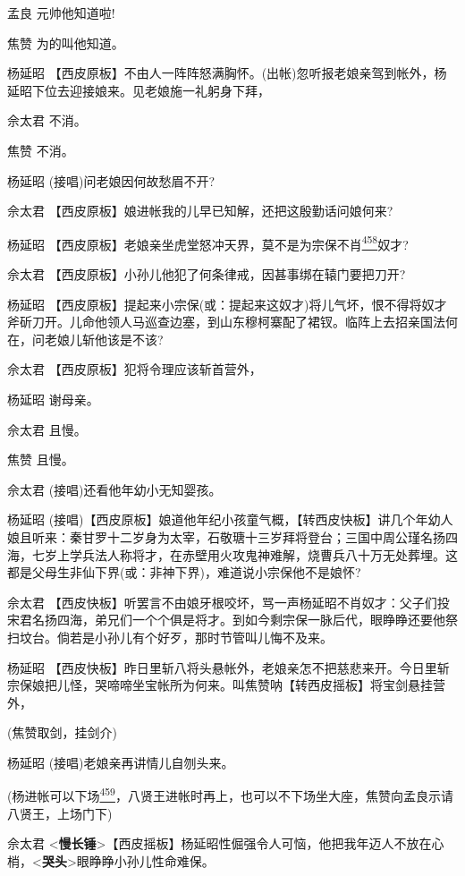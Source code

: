 孟良 元帅他知道啦!

焦赞 为的叫他知道。

杨延昭
【西皮原板】不由人一阵阵怒满胸怀。(出帐)忽听报老娘亲驾到帐外，杨延昭下位去迎接娘来。见老娘施一礼躬身下拜，

佘太君 不消。

焦赞 不消。

杨延昭 (接唱)问老娘因何故愁眉不开?

佘太君 【西皮原板】娘进帐我的儿早已知解，还把这殷勤话问娘何来?

杨延昭
【西皮原板】老娘亲坐虎堂怒冲天界，莫不是为宗保不肖\protect\hyperlink{fn458}{\textsuperscript{458}}奴才?

佘太君 【西皮原板】小孙儿他犯了何条律戒，因甚事绑在辕门要把刀开?

杨延昭
【西皮原板】提起来小宗保(或：提起来这奴才)将儿气坏，恨不得将奴才斧斫刀开。儿命他领人马巡查边塞，到山东穆柯寨配了裙钗。临阵上去招亲国法何在，问老娘儿斩他该是不该?

佘太君 【西皮原板】犯将令理应该斩首营外，

杨延昭 谢母亲。

佘太君 且慢。

焦赞 且慢。

佘太君 (接唱)还看他年幼小无知婴孩。

杨延昭
(接唱)【西皮原板】娘道他年纪小孩童气概，【转西皮快板】讲几个年幼人娘且听来：秦甘罗十二岁身为太宰，石敬瑭十三岁拜将登台；三国中周公瑾名扬四海，七岁上学兵法人称将才，在赤壁用火攻鬼神难解，烧曹兵八十万无处葬埋。这都是父母生非仙下界(或：非神下界)，难道说小宗保他不是娘怀?

佘太君
【西皮快板】听罢言不由娘牙根咬坏，骂一声杨延昭不肖奴才：父子们投宋君名扬四海，弟兄们一个个俱是将才。到如今剩宗保一脉后代，眼睁睁还要他祭扫坟台。倘若是小孙儿有个好歹，那时节管叫儿悔不及来。

杨延昭
【西皮快板】昨日里斩八将头悬帐外，老娘亲怎不把慈悲来开。今日里斩宗保娘把儿怪，哭啼啼坐宝帐所为何来。叫焦赞呐【转西皮摇板】将宝剑悬挂营外，

(焦赞取剑，挂剑介)

杨延昭 (接唱)老娘亲再讲情儿自刎头来。

(杨进帐可以下场\protect\hyperlink{fn459}{\textsuperscript{459}}，八贤王进帐时再上，也可以不下场坐大座，焦赞向孟良示请八贤王，上场门下)

佘太君
\textless{}\textbf{慢长锤}\textgreater{}【西皮摇板】杨延昭性倔强令人可恼，他把我年迈人不放在心梢，\textless{}\textbf{哭头}\textgreater{}眼睁睁小孙儿性命难保。

